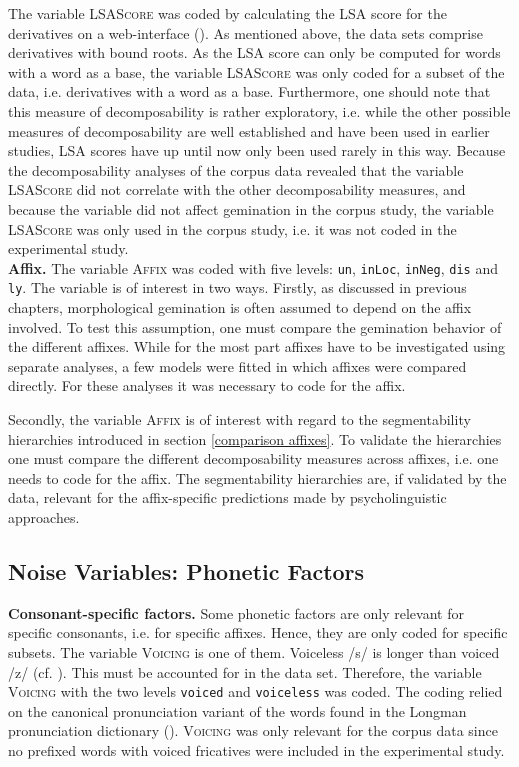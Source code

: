 The variable \textsc{LSAScore} was coded by calculating the LSA score for the derivatives on a web-interface (\citealt{UniversityofColoradoBoulder.25.06.2015}). %
As mentioned above, the data sets comprise derivatives with bound roots. As the LSA score can only be computed for words with a word as a base, the variable \textsc{LSAScore} was only coded for a subset of the data, i.e. derivatives with a word as a base. Furthermore, one should note that this measure of decomposability is rather exploratory, i.e. while the other possible measures of decomposability are well established and have been used in earlier studies, LSA scores have up until now only been used rarely in this way. Because the decomposability analyses of the corpus data revealed that the variable \textsc{LSAScore} did not correlate with the other decomposability measures, and because the variable did not affect gemination in the corpus study, the variable \textsc{LSAScore} was only used in the corpus study, i.e. it was not coded in the experimental study.\\

\textbf{Affix.} The variable \textsc{Affix} was coded with five levels: \texttt{un}, \texttt{inLoc}, \texttt{inNeg}, \texttt{dis} and \texttt{ly}. The variable is of interest in two ways. 
Firstly, as discussed in previous chapters, morphological gemination is often assumed to depend on the affix involved. To test this assumption, one must compare the gemination behavior of the different affixes. While for the most part affixes have to be investigated using separate analyses, a few models were fitted in which affixes were compared directly. For these analyses it was necessary to code for the affix.


Secondly, the variable \textsc{Affix} is of interest with regard to the segmentability hierarchies introduced in section \ref{comparison affixes}. To validate the hierarchies one must compare the different decomposability measures across affixes, i.e. one needs to code for the affix. The segmentability hierarchies are, if validated by the data, relevant for the affix-specific predictions made by psycholinguistic approaches. 


\subsection{Noise Variables: Phonetic Factors}

\textbf{Consonant-specific factors.} Some phonetic factors are only relevant for specific consonants, i.e. for specific affixes. Hence, they are only coded for specific subsets. The variable \textsc{Voicing} is one of them. Voiceless /s/ is longer than voiced /z/ (cf. \citealt{Umeda.1977}). This must be accounted for in the data set. Therefore, the variable \textsc{Voicing} with the two levels \texttt{voiced} and \texttt{voiceless} was coded. The coding relied on the canonical pronunciation variant of the words found in the Longman pronunciation dictionary (\citealt{Wells.2008}). \textsc{Voicing} was only relevant for the corpus data since no prefixed words with voiced fricatives were included in the experimental study.

